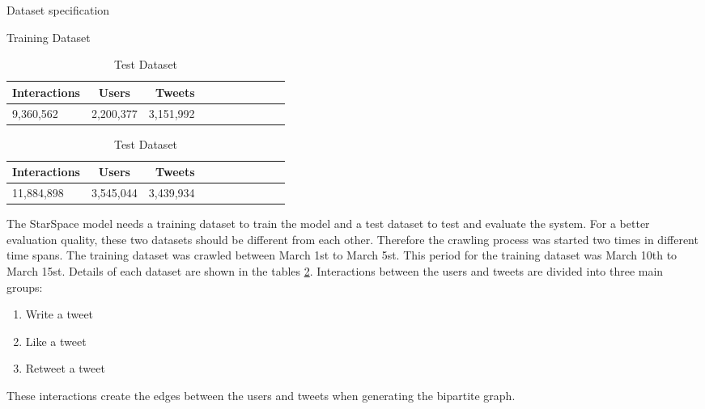 \begin{table}[!h]
	\caption{Dataset specification}
	\label{tab:dataset}
	\begin{subtable}{.5\linewidth}
		\caption{Training Dataset}
		\centering
        \begin{tabular}{|l|c|r|m{0.4\linewidth}|}
            \hline
            \textbf{Interactions} & \textbf{Users} & \textbf{Tweets} \\
            \hline
            9,360,562 & 2,200,377 & 3,151,992	\\
            \hline
        \end{tabular}
	\end{subtable}%
	\begin{subtable}{.5\linewidth}
		\caption{Test Dataset}
		\centering
        \begin{tabular}{|l|c|r|m{0.4\linewidth}|}
            \hline
            \textbf{Interactions} & \textbf{Users} & \textbf{Tweets} \\
            \hline
            11,884,898 & 3,545,044 & 3,439,934	\\
            \hline
        \end{tabular}
	\end{subtable}%
\end{table}

The StarSpace model needs a training dataset to train the model and a test dataset to test and evaluate the system. For a better evaluation quality, these two datasets should be different from each other. Therefore the crawling process was started two times in different time spans. The training dataset was crawled between March 1st to March 5st. This period for the training dataset was March 10th to March 15st. Details of each dataset are shown in the tables \ref{tab:dataset}. Interactions between the users and tweets are divided into three main groups:
\begin{enumerate}
    \item Write a tweet
    \item Like a tweet
    \item Retweet a tweet
\end{enumerate}
These interactions create the edges between the users and tweets when generating the bipartite graph.
